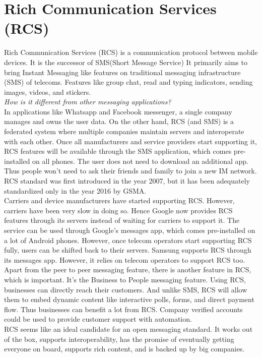 \documentclass[12pt, conference, a4paper]{article}
\begin{document}
\section{Rich Communication Services (RCS)}
\label{SEC: rcs}
Rich Communication Services (RCS) is a communication protocol between mobile devices. It is the successor of SMS(Short Message Service) It primarily aims to bring Instant Messaging like features on traditional messaging infrastructure (SMS) of telecoms. Features like group chat, read and typing indicators, sending images, videos, and stickers.\\
\textit{How is it different from other messaging applications?}\\ In applications like Whatsapp and Facebook messenger, a single company manages and owns the user data. On the other hand, RCS (and SMS) is a federated system where multiple companies maintain servers and interoperate with each other. Once all manufacturers and service providers start supporting it, RCS features will be available through the SMS application, which comes pre-installed on all phones. The user does not need to download an additional app. Thus people won't need to ask their friends and family to join a new IM network. RCS standard was first introduced in the year 2007, but it has been adequately standardized only in the year 2016 by GSMA. \cite{rcs-wiki} \\
Carriers and device manufacturers have started supporting RCS. However, carriers have been very slow in doing so. Hence Google now provides RCS features through its servers instead of waiting for carriers to support it. The service can be used through Google's messages app, which comes pre-installed on a lot of Android phones. However, once telecom operators start supporting RCS fully, users can be shifted back to their servers. Samsung supports RCS through its messages app. However, it relies on telecom operators to support RCS too.\\
Apart from the peer to peer messaging feature, there is another feature in RCS, which is important. It's the Business to People messaging feature. Using RCS, businesses can directly reach their customers. And unlike SMS, RCS will allow them to embed dynamic content like interactive polls, forms, and direct payment flow. Thus businesses can benefit a lot from RCS. Company verified accounts could be used to provide customer support with automation.\\
RCS seems like an ideal candidate for an open messaging standard. It works out of the box, supports interoperability, has the promise of eventually getting everyone on board, supports rich content, and is backed up by big companies.\\
\end{document}
